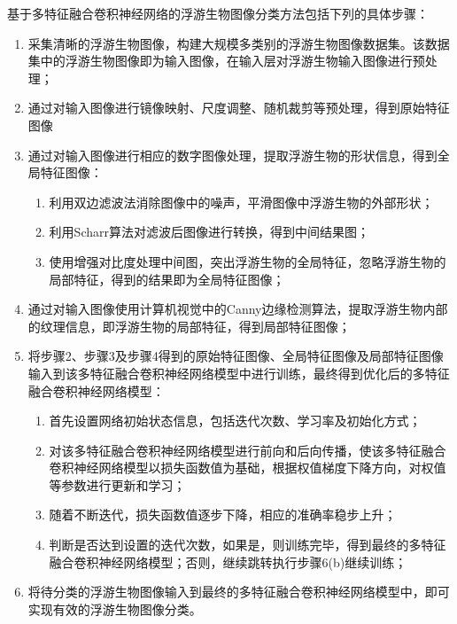 基于多特征融合卷积神经网络的浮游生物图像分类方法包括下列的具体步骤：
\begin{enumerate}
\item 采集清晰的浮游生物图像，构建大规模多类别的浮游生物图像数据集。该数据集中的浮游生物图像即为输入图像，在输入层对浮游生物输入图像进行预处理；

\item 通过对输入图像进行镜像映射、尺度调整、随机裁剪等预处理，得到原始特征图像


\item 通过对输入图像进行相应的数字图像处理，提取浮游生物的形状信息，得到全局特征图像：
\begin{enumerate}
\item 利用双边滤波法消除图像中的噪声，平滑图像中浮游生物的外部形状；
\item 利用Scharr算法对滤波后图像进行转换，得到中间结果图；
\item 使用增强对比度处理中间图，突出浮游生物的全局特征，忽略浮游生物的局部特征，得到的结果即为全局特征图像；
\end{enumerate}

\item 通过对输入图像使用计算机视觉中的Canny边缘检测算法，提取浮游生物内部的纹理信息，即浮游生物的局部特征，得到局部特征图像；

\item 将步骤2、步骤3及步骤4得到的原始特征图像、全局特征图像及局部特征图像输入到该多特征融合卷积神经网络模型中进行训练，最终得到优化后的多特征融合卷积神经网络模型：
\begin{enumerate}
\item 首先设置网络初始状态信息，包括迭代次数、学习率及初始化方式；
\item 对该多特征融合卷积神经网络模型进行前向和后向传播，使该多特征融合卷积神经网络模型以损失函数值为基础，根据权值梯度下降方向，对权值等参数进行更新和学习；
\item 随着不断迭代，损失函数值逐步下降，相应的准确率稳步上升；
\item 判断是否达到设置的迭代次数，如果是，则训练完毕，得到最终的多特征融合卷积神经网络模型；否则，继续跳转执行步骤6(b)继续训练；
\end{enumerate}


\item 将待分类的浮游生物图像输入到最终的多特征融合卷积神经网络模型中，即可实现有效的浮游生物图像分类。 

\end{enumerate}

